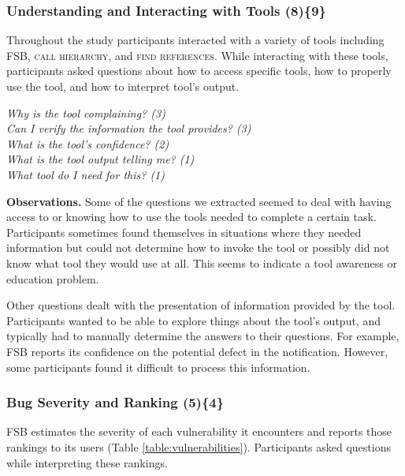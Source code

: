 \documentclass{acm_proc_article-sp}
\begin{document}

\subsubsection{\textbf{Understanding and Interacting with Tools (8)\{9\}}}\label{uit}

Throughout the study participants interacted with a variety of tools including FSB, \textsc{call hierarchy}, and \textsc{find references}. 
While interacting with these tools, participants asked questions about how to access specific tools, how to properly use the tool, and how to interpret tool's output. 


\noindent\emph{Why is the tool complaining? (3)} \\
\emph{Can I verify the information the tool provides? (3)} \\
\emph{What is the tool's confidence? (2)} \\
\emph{What is the tool output telling me? (1)} \\
\emph{What tool do I need for this? (1)} 


\noindent\textbf{Observations.}
Some of the questions we extracted seemed to deal with having access to or knowing how to use the tools needed to complete a certain task. 
Participants sometimes found themselves in situations where they needed information but could not determine how to invoke the tool or possibly did not know what tool they would use at all. 
This seems to indicate a tool awareness or education problem.

Other questions dealt with the presentation of information provided by the tool. 
Participants wanted to be able to explore things about the tool's output, and typically had to manually determine the answers to their questions. 
For example, FSB reports its confidence on the potential defect in the notification. 
However, some participants found it difficult to process this information.




\subsubsection{\textbf{Bug Severity and Ranking (5)\{4\}}}\label{bsr}

FSB estimates the severity of each vulnerability it encounters and reports those rankings to its users (Table \ref{table:vulnerabilities}). 
Participants asked questions while interpreting these rankings.
\end{document}
